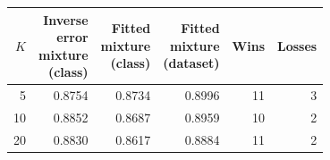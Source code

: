 \begin{tabular}{rrrrrr}
\toprule
$K$ & \shortstack[r]{Inverse\\error\\mixture\\(class)} & \shortstack[r]{Fitted\\mixture\\(class)} & \shortstack[r]{Fitted\\mixture\\(dataset)} & Wins & Losses \\
\midrule
5 & 0.8754 & 0.8734 & 0.8996 & 11 & 3 \\
10 & 0.8852 & 0.8687 & 0.8959 & 10 & 2 \\
20 & 0.8830 & 0.8617 & 0.8884 & 11 & 2 \\
\bottomrule
\end{tabular}
